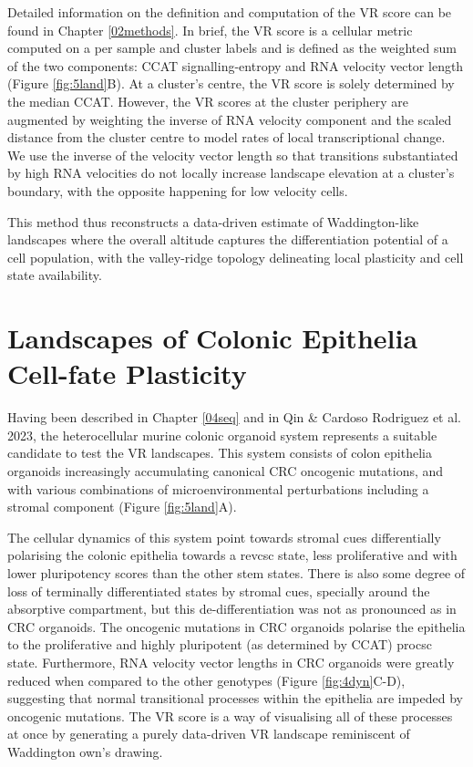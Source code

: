 Detailed information on the definition and computation of the VR score can be found in Chapter \ref{02methods}. In brief, the VR score is a cellular metric computed on a per sample and cluster labels and is defined as the weighted sum of the two components: CCAT signalling-entropy \cite{teschendorff_single-cell_2017} and RNA velocity vector length\cite{bergen_generalizing_2020} (Figure \ref{fig:5land}B). 
At a cluster's centre, the VR score is solely determined by the median CCAT. However, the VR scores at the cluster periphery are augmented by weighting the inverse of RNA velocity component and the scaled distance from the cluster centre to model rates of local transcriptional change. We use the inverse of the velocity vector length so that transitions substantiated by high RNA velocities do not locally increase landscape elevation at a cluster's boundary, with the opposite happening for low velocity cells.

This method thus reconstructs a data-driven estimate of Waddington-like landscapes where the overall altitude captures the differentiation potential of a cell population, with the valley-ridge topology delineating local plasticity and cell state availability. 

\section{Landscapes of Colonic Epithelia Cell-fate Plasticity}

Having been described in Chapter \ref{04seq} and in Qin \& Cardoso Rodriguez et al. 2023, the heterocellular murine colonic organoid system represents a suitable candidate to test the VR landscapes. 
This system consists of colon epithelia organoids increasingly accumulating canonical CRC oncogenic mutations, and with various combinations of microenvironmental perturbations including a stromal component (Figure \ref{fig:5land}A).

The cellular dynamics of this system point towards stromal cues differentially polarising the colonic epithelia towards a \acrshort{revcsc} state, less proliferative and with lower pluripotency scores than the other stem states. There is also some degree of loss of terminally differentiated states by stromal cues, specially around the absorptive compartment, but this de-differentiation was not as pronounced as in CRC organoids.
The oncogenic mutations in CRC organoids polarise the epithelia to the proliferative and highly pluripotent (as determined by CCAT) \acrshort{procsc} state. Furthermore, RNA velocity vector lengths in CRC organoids were greatly reduced when compared to the other genotypes (Figure \ref{fig:4dyn}C-D), suggesting that normal transitional processes within the epithelia are impeded by oncogenic mutations.
The VR score is a way of visualising all of these processes at once by generating a purely data-driven VR landscape reminiscent of Waddington own's drawing.

